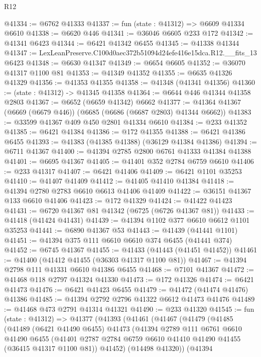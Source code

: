 \begin{lexlean}{R12}
\begin{coremodule}
@41334 := @6762 @41333
@41337 := fun (state : @41312) => @6609 @41334 @6610
@41338 := @6620 @446
@41341 := @36046 @6605 @233 @172
@41342 := @41341 @6423
@41344 := @6421 @41342 @6455
@41345 := @41338 @41344
@41347 := LexLeanPreserve.C100d0aec372b51094d24efe416e15dca.R12.__fits_13 @6423
@41348 := @6630 @41347
@41349 := @6654 @6605
@41352 := @36070 @41317 @1100 @81
@41353 := @41349 @41352
@41355 := @6635 @41326 @41329
@41356 := @41353 @41355
@41358 := @41348 (@41341 @41356)
@41360 := (state : @41312) -> @41345 @41358
@41364 := @6644 @446 @41344 @41358 @2803
@41367 := @6652 (@6659 @41342) @6662
@41377 := @41364 @41367 (@6669 (@6679 @446)) (@6685 (@6686 (@6687 @2803) @41344 @6662))
@41383 := @33599 @41367 @409 @450 @2801 @41334 @6610
@41384 := @233 @41352
@41385 := @6421 @41384
@41386 := @172 @41355
@41388 := @6421 @41386 @6455
@41393 := @41383 (@41385 @41388) (@36129 @41384 @41386)
@41394 := @6711 @41367
@41400 := @41394 @2785 @2800 @6761 @41333 @41384 @41388
@41401 := @6695 @41367
@41405 := @41401 @352 @2784 @6759 @6610
@41406 := @233 @41317
@41407 := @6421 @41406
@41409 := @6421 @1101 @35253
@41410 := @41407 @41409
@41412 := @41405 @41410 @41384
@41418 := @41394 @2780 @2783 @6610 @6613 @41406 @41409
@41422 := @36151 @41367 @133 @6610 @41406
@41423 := @172 @41329
@41424 := @41422 @41423
@41431 := @6720 @41367 @81 @41342 (@6725 (@6726 @41367 @81))
@41433 := @41418 (@41424 @41431)
@41439 := @41394 @1102 @377 @6610 @6612 @1101 @35253
@41441 := @6890 @41367 @53
@41443 := @41439 (@41441 @1101)
@41451 := @41394 @375 @111 @6610 @6610 @374 @6455 (@41441 @374)
@41452 := @6745 @41367
@41455 := @41433 (@41443 (@41451 @41452))
@41461 := @41400 (@41412 @41455 (@36303 @41317 @1100 @81))
@41467 := @41394 @2798 @111 @41331 @6610 @41386 @6455
@41468 := @7101 @41367
@41472 := @41468 @118 @2797 @41324 @41330
@41473 := @172 @41326
@41474 := @6421 @41473
@41476 := @6421 @41423 @6455
@41479 := @41472 (@41474 @41476) @41386
@41485 := @41394 @2792 @2796 @41322 @6612 @41473 @41476
@41489 := @41468 @473 @2791 @41314 @41321
@41490 := @233 @41320
@41545 := fun (state : @41312) =>
  @41377
    (@41393
      (@41461
        (@41467
          (@41479
            (@41485
              (@41489
                (@6421 @41490 @6455)
                @41473
                (@41394
                  @2789
                  @111
                  @6761
                  @6610
                  @41490
                  @6455
                  (@41401 @2787 @2784 @6759 @6610 @41410 @41490 @41455 (@36415 @41317 @1100 @81))
                  @41452)
                (@14498 @41320))
              (@41394

\end{coremodule}
\end{lexlean}
